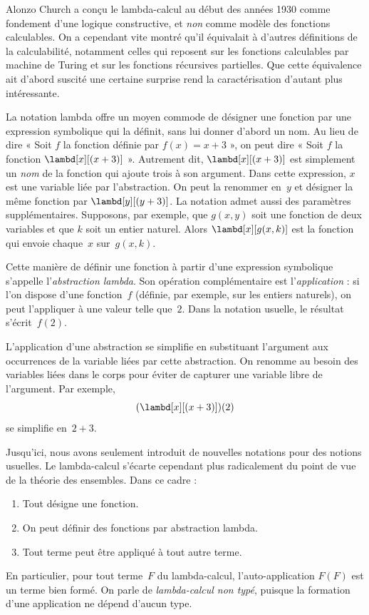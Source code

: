 \documentclass[../../../include/open-logic-section]{subfiles}
\begin{document}

Alonzo Church a conçu le lambda-calcul au début
des années 1930 comme fondement d'une logique
constructive, et \emph{non} comme modèle des
fonctions calculables. On a cependant vite montré
qu'il équivalait à d'autres définitions de la
calculabilité, notamment celles qui reposent sur
les fonctions calculables par machine de Turing
et sur les fonctions récursives partielles. Que
cette équivalence ait d'abord suscité une certaine
surprise rend la caractérisation d'autant plus
intéressante.

La notation lambda offre un moyen commode de
désigner une fonction par une expression
symbolique qui la définit, sans lui donner
d'abord un nom. Au lieu
de dire « Soit $f$ la fonction définie par
$f(x)=x+3$ », on peut dire « Soit $f$ la fonction
$\lambd[x][(x+3)]$ ». Autrement dit,
$\lambd[x][(x+3)]$ est simplement un \emph{nom}
de la fonction qui ajoute trois à son argument.
Dans cette expression, $x$ est une variable liée par l'abstraction.
On peut la renommer en~$y$ et désigner la même fonction par
$\lambd[y][(y+3)]$. La notation admet aussi des
paramètres supplémentaires. Supposons, par
exemple, que $g(x,y)$ soit une fonction de deux
variables et que $k$ soit un entier naturel.
Alors $\lambd[x][g(x,k)]$ est la fonction qui
envoie chaque~$x$ sur~$g(x,k)$.

Cette manière de définir une fonction à partir
d'une expression symbolique s'appelle
l'\emph{abstraction lambda}. Son opération
complémentaire est l'\emph{application} : si
l'on dispose d'une fonction~$f$ (définie, par
exemple, sur les entiers naturels), on peut
l'appliquer à une valeur telle que~$2$. Dans
la notation usuelle, le résultat s'écrit~$f(2)$.

L'application d'une abstraction se simplifie en substituant
l'argument aux occurrences de la variable liées par cette
abstraction. On renomme au besoin des variables liées dans
le corps pour éviter de capturer une variable libre de l'argument. Par exemple,
\[
(\lambd[x][(x+3)])(2)
\]
se simplifie en~$2+3$.

Jusqu'ici, nous avons seulement introduit de
nouvelles notations pour des notions usuelles.
Le lambda-calcul s'écarte cependant plus
radicalement du point de vue de la théorie des
ensembles. Dans ce cadre :
\begin{enumerate}
\item Tout désigne une fonction.
\item On peut définir des fonctions par
      abstraction lambda.
\item Tout terme peut être appliqué à tout autre terme.
\end{enumerate}
En particulier, pour tout terme~$F$ du lambda-calcul,
l'auto-application $F(F)$ est un terme bien formé. On
parle de \emph{lambda-calcul non typé}, puisque la
formation d'une application ne dépend d'aucun type.
\end{document}
